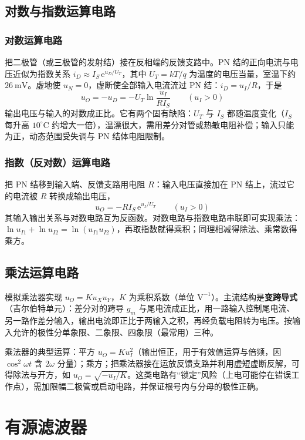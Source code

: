 \subsection{对数与指数运算电路}
\subsubsection{对数运算电路}
把二极管（或三极管的发射结）接在反相端的反馈支路中。PN 结的正向电流与电压近似为指数关系 $i_D\approx I_S\,\mathrm{e}^{u_D/U_T}$，其中 $U_T=kT/q$ 为温度的电压当量，室温下约 $26\ \mathrm{mV}$。虚地使 $u_N=0$，虚断使全部输入电流流过 PN 结：$i_D=u_I/R$，于是
\begin{equation}
u_O = -u_D = -U_T\ln\frac{u_I}{R I_S}\qquad (u_I>0)
\end{equation}
输出电压与输入的对数成正比。它有两个固有缺陷：$U_T$ 与 $I_S$ 都随温度变化（$I_S$ 每升高 $10^\circ\mathrm{C}$ 约增大一倍），温漂很大，需用差分对管或热敏电阻补偿；输入只能为正，动态范围受失调与 PN 结体电阻限制。

\subsubsection{指数（反对数）运算电路}
把 PN 结移到输入端、反馈支路用电阻 $R$：输入电压直接加在 PN 结上，流过它的电流被 $R$ 转换成输出电压，
\begin{equation}
u_O = -R I_S\,\mathrm{e}^{u_I/U_T}\qquad (u_I>0)
\end{equation}
其输入输出关系与对数电路互为反函数。对数电路与指数电路串联即可实现乘法：$\ln u_{I1}+\ln u_{I2}=\ln(u_{I1}u_{I2})$，再取指数就得乘积；同理相减得除法、乘常数得乘方。

\subsection{乘法运算电路}
模拟乘法器实现 $u_O=K u_X u_Y$，$K$ 为乘积系数（单位 $\mathrm{V^{-1}}$）。主流结构是\textbf{变跨导式}（吉尔伯特单元）：差分对的跨导 $g_m$ 与尾电流成正比，用一路输入控制尾电流、另一路作差分输入，输出电流即正比于两输入之积，再经负载电阻转为电压。按输入允许的极性分单象限、二象限、四象限（最常用）三种。

乘法器的典型运算：平方 $u_O=Ku_I^2$（输出恒正，用于有效值运算与倍频，因 $\cos^2\omega t$ 含 $2\omega$ 分量）；乘方；把乘法器接在运放反馈支路并利用虚短虚断反解，可得除法与开方，如 $u_O=\sqrt{-u_I/K}$。这类电路有“锁定”风险（上电可能停在错误工作点），需加限幅二极管或启动电路，并保证根号内与分母的极性正确。

\section{有源滤波器}

